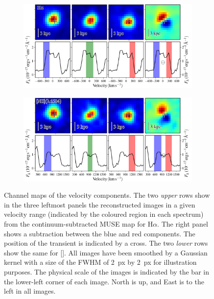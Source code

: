 \documentclass[traditabstract]{aa}
\newcommand{\ha}{H$\alpha$}
\newcommand{\nii}{[\ion{N}{ii}]}
\begin{document}
\begin{figure}
\begin{subfigure}{.49\textwidth}
  \includegraphics[width=0.999\linewidth]{fig/MUSE_Ha_channelmaps.pdf}
\end{subfigure}
\begin{subfigure}{.49\textwidth}
  \includegraphics[width=0.999\linewidth]{fig/MUSE_NII_channelmaps.pdf}
\end{subfigure}

\caption{Channel maps of the velocity components. The two \textit{upper} rows show in the three leftmost panels the reconstructed images in a given velocity range (indicated by the coloured region in each spectrum) from the continuum-subtracted MUSE map for \ha. The right panel shows a subtraction between the blue and red components. The position of the transient is indicated by a cross. The two \textit{lower} rows show the same for \nii. All images have been smoothed by a Gaussian kernel with a size of the FWHM of 2~px by 2~px for illustration purposes. The physical scale of the images is indicated by the bar in the lower-left corner of each image. North is up, and East is to the left in all images.}
\label{fig:channelmaps}
\end{figure}
\end{document}
